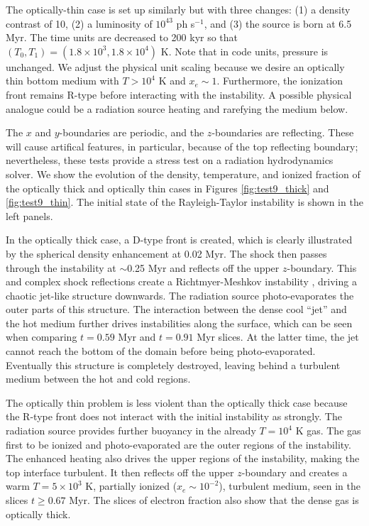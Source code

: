 \documentclass[useAMS,usenatbib]{mn2e}
\begin{document}
The optically-thin case is set up similarly but with three changes:
(1) a density contrast of 10, (2) a luminosity of $10^{43}$ ph
s$^{-1}$, and (3) the source is born at 6.5 Myr.  The time units are
decreased to 200 kyr so that $(T_0, T_1) = (1.8 \times 10^3, 1.8
\times 10^4)$ K.  Note that in code units, pressure is unchanged.  We
adjust the physical unit scaling because we desire an optically thin
bottom medium with $T > 10^4$ K and $x_e \sim 1$.  Furthermore, the
ionization front remains R-type before interacting with the
instability.  A possible physical analogue could be a radiation source
heating and rarefying the medium below.

The $x$ and $y$-boundaries are periodic, and the $z$-boundaries are
reflecting.  These will cause artifical features, in particular,
because of the top reflecting boundary; nevertheless, these tests
provide a stress test on a radiation hydrodynamics solver.  We show
the evolution of the density, temperature, and ionized fraction of the
optically thick and optically thin cases in Figures
\ref{fig:test9_thick} and \ref{fig:test9_thin}.  The initial state of
the Rayleigh-Taylor instability is shown in the left panels.

In the optically thick case, a D-type front is created, which is
clearly illustrated by the spherical density enhancement at 0.02 Myr.
The shock then passes through the instability at $\sim$0.25 Myr and
reflects off the upper $z$-boundary.  This and complex shock
reflections create a Richtmyer-Meshkov instability \citep[see][for a
review]{RMI}, driving a chaotic jet-like structure downwards.  The
radiation source photo-evaporates the outer parts of this structure.
The interaction between the dense cool ``jet'' and the hot medium
further drives instabilities along the surface, which can be seen when
comparing $t = 0.59$ Myr and $t = 0.91$ Myr slices.  At the latter
time, the jet cannot reach the bottom of the domain before being
photo-evaporated.  Eventually this structure is completely destroyed,
leaving behind a turbulent medium between the hot and cold regions.

The optically thin problem is less violent than the optically thick
case because the R-type front does not interact with the initial
instability as strongly.  The radiation source provides further
buoyancy in the already $T=10^4$ K gas.  The gas first to be ionized
and photo-evaporated are the outer regions of the instability.  The
enhanced heating also drives the upper regions of the instability,
making the top interface turbulent.  It then reflects off the upper
$z$-boundary and creates a warm $T = 5 \times 10^3$ K, partially
ionized ($x_e \sim 10^{-2}$), turbulent medium, seen in the slices $t
\ge 0.67$ Myr.  The slices of electron fraction also show that the
dense gas is optically thick.
\end{document}
